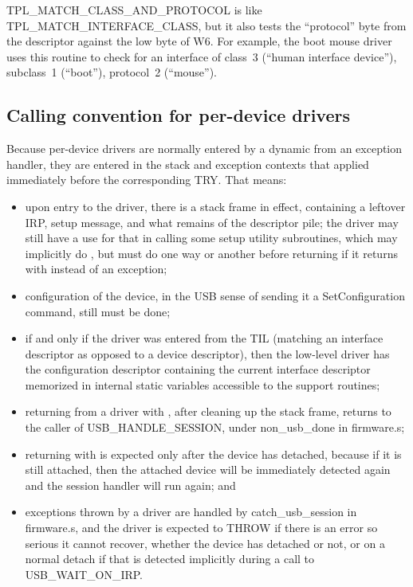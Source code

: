 TPL\_MATCH\_CLASS\_AND\_PROTOCOL is like TPL\_MATCH\_INTERFACE\_CLASS,
but it also tests the ``protocol'' byte from the descriptor against the low
byte of W6.  For example, the boot mouse driver uses this routine to check
for an interface of class~3 (``human interface device''), subclass~1
(``boot''), protocol~2 (``mouse'').

\subsection{Calling convention for per-device drivers}

Because per-device drivers are normally entered by a dynamic 
from an exception handler, they are entered in the stack and exception
contexts that applied immediately before the corresponding TRY.  That means:
\begin{itemize}
  \item upon entry to the driver, there is a  stack frame in
    effect, containing a leftover IRP, setup message, and what remains of
    the descriptor pile; the driver may still have a use for that in calling
    some setup utility subroutines, which may implicitly do , but
    must do  one way or another before returning if it returns
    with  instead of an exception;
  \item configuration of the device, in the USB sense of sending it a
    SetConfiguration command, still must be done;
  \item if and only if the driver was entered from the TIL (matching an
    interface descriptor as opposed to a device descriptor), then the
    low-level driver has the configuration descriptor containing the current
    interface descriptor memorized in internal static variables accessible
    to the support routines;
  \item returning from a driver with , after cleaning up the
    stack frame, returns to the caller of
    USB\_HANDLE\_SESSION, under non\_usb\_done in firmware.s;
  \item returning with  is expected only after the device has
    detached, because if it is still attached, then the attached device will
    be immediately detected again and the session handler will run again; and
  \item exceptions thrown by a driver are handled by catch\_usb\_session in
    firmware.s, and the driver is expected to THROW if there is an error
    so serious it cannot recover, whether the device has detached or
    not, or on a normal detach if that is detected implicitly during a call
    to USB\_WAIT\_ON\_IRP.
\end{itemize}

